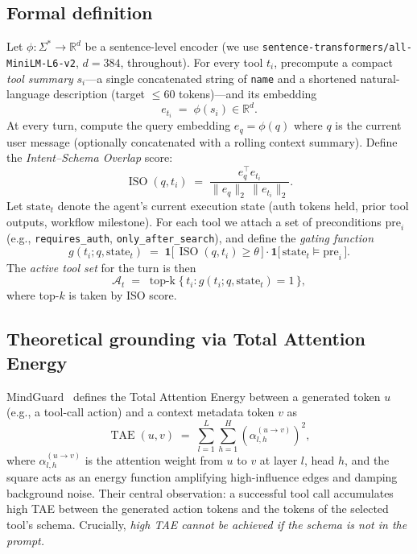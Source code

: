 \documentclass[11pt]{article}
\newcommand{\ISO}{\operatorname{ISO}}
\newcommand{\TAE}{\operatorname{TAE}}
\DeclareMathOperator*{\topk}{top\text{-}k}
\begin{document}
\subsection{Formal definition}

Let $\phi:\Sigma^* \to \mathbb{R}^d$ be a sentence-level encoder (we use \texttt{sentence-transformers/all-MiniLM-L6-v2}, $d=384$, throughout). For every tool $t_i$, precompute a compact \emph{tool summary} $s_i$---a single concatenated string of \texttt{name} and a shortened natural-language description (target $\le 60$ tokens)---and its embedding
\begin{equation}
e_{t_i} \;=\; \phi(s_i) \in \mathbb{R}^d.
\end{equation}
At every turn, compute the query embedding $e_q = \phi(q)$ where $q$ is the current user message (optionally concatenated with a rolling context summary). Define the \emph{Intent--Schema Overlap} score:
\begin{equation}
\ISO(q, t_i) \;=\; \frac{e_q^\top e_{t_i}}{\lVert e_q \rVert_2 \, \lVert e_{t_i} \rVert_2}.
\label{eq:iso}
\end{equation}
Let $\text{state}_t$ denote the agent's current execution state (auth tokens held, prior tool outputs, workflow milestone). For each tool we attach a set of preconditions $\text{pre}_i$ (e.g., \texttt{requires\_auth}, \texttt{only\_after\_search}), and define the \emph{gating function}
\begin{equation}
g(t_i; q, \text{state}_t) \;=\; \mathbf{1}\!\bigl[\,\ISO(q, t_i) \ge \theta\,\bigr] \cdot \mathbf{1}\!\bigl[\,\text{state}_t \models \text{pre}_i\,\bigr].
\label{eq:gate}
\end{equation}
The \emph{active tool set} for the turn is then
\begin{equation}
\mathcal{A}_t \;=\; \topk \bigl\{\, t_i : g(t_i; q, \text{state}_t) = 1 \,\bigr\},
\end{equation}
where top-$k$ is taken by ISO score.

\subsection{Theoretical grounding via Total Attention Energy}\label{sec:mechanism:tae}

MindGuard~\citep{wang2025mindguard_v1,wang2026mindguard_v3} defines the Total Attention Energy between a generated token $u$ (e.g., a tool-call action) and a context metadata token $v$ as
\begin{equation}
\TAE(u, v) \;=\; \sum_{l=1}^{L} \sum_{h=1}^{H} \left(\alpha_{l,h}^{(u \to v)}\right)^{2},
\label{eq:tae}
\end{equation}
where $\alpha_{l,h}^{(u \to v)}$ is the attention weight from $u$ to $v$ at layer $l$, head $h$, and the square acts as an energy function amplifying high-influence edges and damping background noise. Their central observation: a successful tool call accumulates high TAE between the generated action tokens and the tokens of the selected tool's schema. Crucially, \emph{high TAE cannot be achieved if the schema is not in the prompt.}
\end{document}
